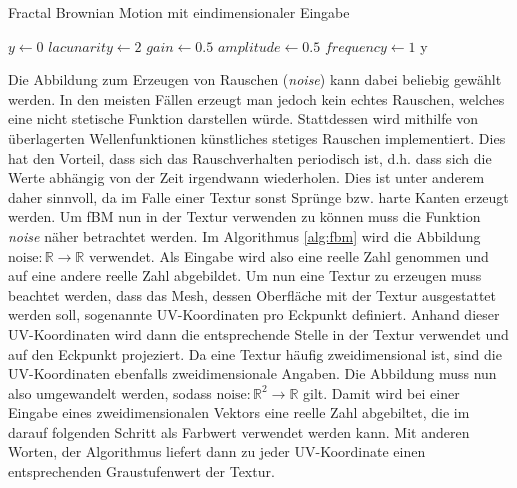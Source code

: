 \begin{algorithm}
  \caption{Fractal Brownian Motion mit eindimensionaler Eingabe}
  \label{alg:fbm}
  \SetAlgoLined


  \BlankLine
  $y \leftarrow 0$\;
  $\mathit{lacunarity}\leftarrow 2$\;
  $\mathit{gain}\leftarrow 0.5$\;
  \BlankLine
  $\mathit{amplitude}\leftarrow 0.5$\;
  $\mathit{frequency}\leftarrow 1$\;
  \BlankLine
  \BlankLine
  \Return y\;

\end{algorithm}

Die Abbildung zum Erzeugen von Rauschen (\textit{noise}) kann dabei beliebig
gewählt werden. In den meisten Fällen erzeugt man jedoch kein echtes Rauschen,
welches eine nicht stetische Funktion darstellen würde. Stattdessen wird
mithilfe von überlagerten Wellenfunktionen künstliches stetiges Rauschen
implementiert. Dies hat den Vorteil, dass sich das Rauschverhalten periodisch
ist, d.h. dass sich die Werte abhängig von der Zeit irgendwann wiederholen. Dies
ist unter anderem daher sinnvoll, da im Falle einer Textur sonst Sprünge bzw.
harte Kanten erzeugt werden. Um fBM nun in der Textur verwenden zu können muss
die Funktion \textit{noise} näher betrachtet werden. Im Algorithmus
\ref{alg:fbm} wird die Abbildung $\text{noise}: \mathbb{R} \to \mathbb{R}$
verwendet. Als Eingabe wird also eine reelle Zahl genommen und auf eine andere
reelle Zahl abgebildet. Um nun eine Textur zu erzeugen muss beachtet werden,
dass das Mesh, dessen Oberfläche mit der Textur ausgestattet werden soll,
sogenannte UV-Koordinaten pro Eckpunkt definiert. Anhand dieser UV-Koordinaten
wird dann die entsprechende Stelle in der Textur verwendet und auf den Eckpunkt
projeziert. Da eine Textur häufig zweidimensional ist, sind die UV-Koordinaten
ebenfalls zweidimensionale Angaben. Die Abbildung muss nun also umgewandelt
werden, sodass $\text{noise}: \mathbb{R}^2 \to \mathbb{R}$ gilt. Damit wird bei
einer Eingabe eines zweidimensionalen Vektors eine reelle Zahl abgebiltet, die
im darauf folgenden Schritt als Farbwert verwendet werden kann. Mit anderen
Worten, der Algorithmus liefert dann zu jeder UV-Koordinate einen entsprechenden
Graustufenwert der Textur.

